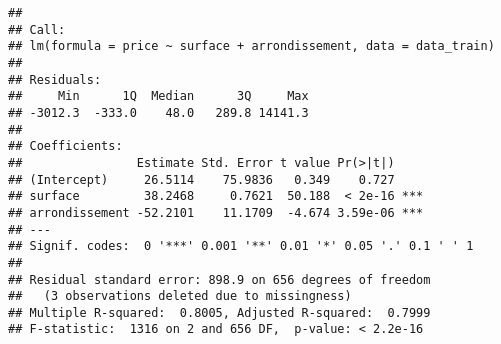 \documentclass[]{article}
\begin{document}
\begin{verbatim}
## 
## Call:
## lm(formula = price ~ surface + arrondissement, data = data_train)
## 
## Residuals:
##     Min      1Q  Median      3Q     Max 
## -3012.3  -333.0    48.0   289.8 14141.3 
## 
## Coefficients:
##                Estimate Std. Error t value Pr(>|t|)    
## (Intercept)     26.5114    75.9836   0.349    0.727    
## surface         38.2468     0.7621  50.188  < 2e-16 ***
## arrondissement -52.2101    11.1709  -4.674 3.59e-06 ***
## ---
## Signif. codes:  0 '***' 0.001 '**' 0.01 '*' 0.05 '.' 0.1 ' ' 1
## 
## Residual standard error: 898.9 on 656 degrees of freedom
##   (3 observations deleted due to missingness)
## Multiple R-squared:  0.8005, Adjusted R-squared:  0.7999 
## F-statistic:  1316 on 2 and 656 DF,  p-value: < 2.2e-16
\end{verbatim}
\end{document}
